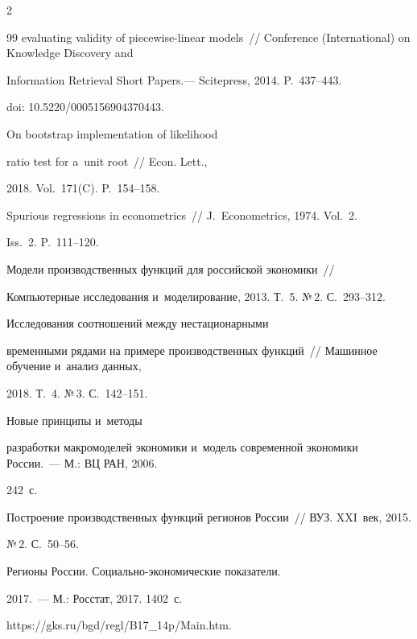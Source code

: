 \begin{multicols}{2}
{{\begin{thebibliography}{99}
evaluating validity of piecewise-linear models~// Conference (International) on Knowledge Discovery and 


Information Retrieval Short Papers.--- Scitepress, 2014. P.~437--443.


doi: 10.5220/0005156904370443.




   On bootstrap implementation of likelihood 


  ratio test for a~unit root~// Econ. Lett., 


2018. Vol.~171(C). P.~154--158.




   Spurious regressions in econometrics~// J.~Econometrics, 1974. Vol.~2. 


Iss.~2. P.~111--120.




   Модели производственных функций для российской экономики~// 


Компьютерные исследования и~моделирование, 2013. Т.~5. №\,2. С.~293--312.




   Исследования соотношений между нестационарными 


временными рядами на примере производственных функций~// Машинное обучение и~анализ данных, 


2018. Т.~4. №\,3. С.~142--151.




   Новые принципы и~методы 


разработки макромоделей экономики и~модель современной экономики России.~--- М.: ВЦ РАН, 2006. 


242~с.




   Построение производственных функций регионов России~// ВУЗ. XXI~век, 2015. 


№\,2. С.~50--56.




  Регионы России. Социально-экономические показатели. 


  2017.~--- М.: Росстат, 2017. 1402~с.


  {\sf https://gks.ru/bgd/regl/B17\_14p/Main.htm}.





\end{thebibliography}}}
\end{multicols}
